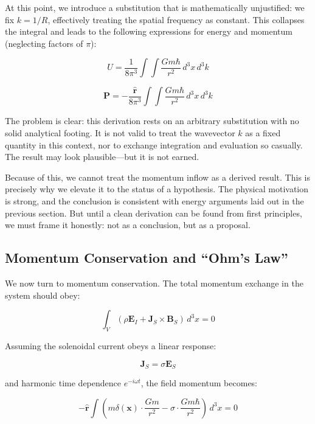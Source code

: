 \documentclass {article}
\renewcommand\vec{\mathbf}
\let\OldHat\hat
\renewcommand{\hat}[1]{\OldHat{\mathbf{#1}}}
\begin{document}
At this point, we introduce a substitution that is mathematically unjustified: we fix \(k = 1/R\), effectively treating the spatial frequency as constant. This collapses the integral and leads to the following expressions for energy and momentum (neglecting factors of \(\pi\)):

\begin{equation}
U = \frac{1}{8\pi^3} \int \int \frac{Gm\hbar}{r^2} \, d^3x \, d^3k
\end{equation}

\begin{equation}
\vec{P} = -\frac{\hat{r}}{8\pi^3} \int \int \frac{Gm\hbar}{r^2} \, d^3x \, d^3k
\end{equation}

The problem is clear: this derivation rests on an arbitrary substitution with no solid analytical footing. It is not valid to treat the wavevector \(k\) as a fixed quantity in this context, nor to exchange integration and evaluation so casually. The result may look plausible—but it is not earned.

Because of this, we cannot treat the momentum inflow as a derived result. This is precisely why we elevate it to the status of a hypothesis. The physical motivation is strong, and the conclusion is consistent with energy arguments laid out in the previous section. But until a clean derivation can be found from first principles, we must frame it honestly: not as a conclusion, but as a proposal.


\subsection{Momentum Conservation and “Ohm’s Law”}

We now turn to momentum conservation. The total momentum exchange in the system should obey:

\begin{equation}
\int_V \left( \rho \vec{E}_I + \vec{J}_S \times \vec{B}_S \right) \, d^3x = 0
\end{equation}


Assuming the solenoidal current obeys a linear response:

\begin{equation}
\vec{J}_S = \sigma \vec{E}_S
\end{equation}

and harmonic time dependence \(e^{-i \omega t}\), the field momentum becomes:

\begin{equation}
-\hat{r} \int \left( m \delta(\vec{x}) \cdot \frac{G m}{r^2} - \sigma \cdot \frac{G m \hbar}{r^2} \right) \, d^3x = 0
\end{equation}
\end{document}
